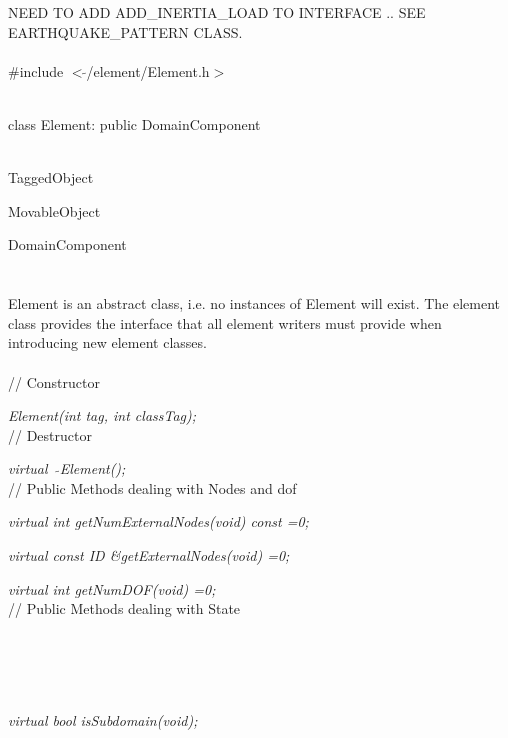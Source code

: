 
NEED TO ADD ADD\_INERTIA\_LOAD TO INTERFACE .. SEE EARTHQUAKE\_PATTERN
CLASS.\\

   \\
\#include $<\tilde{ }$/element/Element.h$>$  


  \\
class Element: public DomainComponent 


 \\
TaggedObject 

MovableObject 

\indent\indent DomainComponent \\
\indent\indent{} \\

  \\
\indent Element is an abstract class, i.e. no instances of Element
will exist. The element class provides the interface that all element
writers must provide when introducing new element classes. \\


 \\
// Constructor 

{\em Element(int tag, int classTag);}  \\ 

// Destructor 

{\em virtual~ $\tilde{}$Element();}\\ 

// Public Methods dealing with Nodes and dof

{\em virtual int getNumExternalNodes(void) const =0;} 

{\em virtual const ID \&getExternalNodes(void) =0;} 

{\em virtual int getNumDOF(void) =0;}\\ 

// Public Methods dealing with State

 \\
 \\ 
 \\
 \\
{\em virtual bool isSubdomain(void);} \\ 


